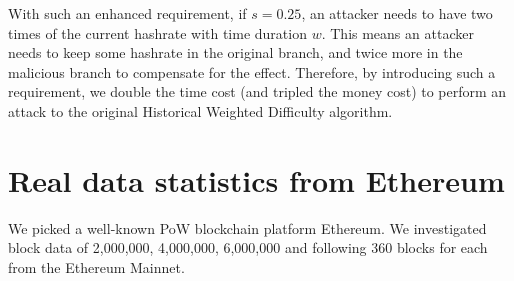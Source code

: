 \documentclass[conference]{IEEEtran}
\begin{document}
With such an enhanced requirement, if $s=0.25$, an attacker needs to have two times of the current hashrate with time duration $w$. This means an attacker needs to keep some hashrate in the original branch, and twice more in the malicious branch to compensate for the effect. Therefore, by introducing such a requirement, we double the time cost (and tripled the money cost) to perform an attack to the original Historical Weighted Difficulty algorithm.

\section{Real data statistics from Ethereum}

We picked a well-known PoW blockchain platform Ethereum. We investigated block data of 2,000,000, 4,000,000, 6,000,000 and following 360 blocks for each from the Ethereum Mainnet.
\end{document}
